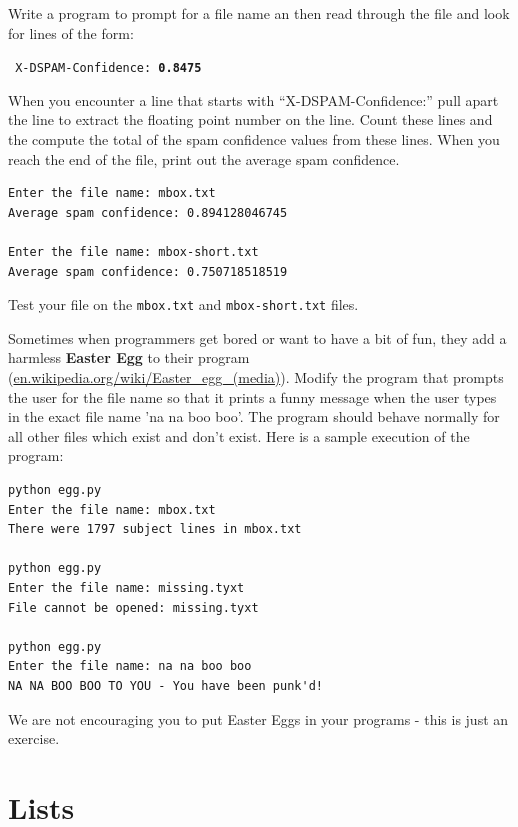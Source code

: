 \documentclass[10pt]{book}
\begin{document}
\begin{ex}
Write a program 
to prompt for a file name an then read through the file 
and look for lines of the form:

{\tt
X-DSPAM-Confidence: {\bf 0.8475}
}

When you encounter a line that starts with 
``X-DSPAM-Confidence:'' pull apart the line to extract the
floating point number on the line.  Count these 
lines and the compute the total of the spam confidence 
values from these lines.
When you reach the end of the file, print out the average
spam confidence.

\beforeverb
\begin{verbatim}
Enter the file name: mbox.txt
Average spam confidence: 0.894128046745

Enter the file name: mbox-short.txt
Average spam confidence: 0.750718518519
\end{verbatim}
\afterverb
%
Test your file on the {\tt mbox.txt} and {\tt mbox-short.txt} files.
\end{ex}


\begin{ex}
Sometimes when programmers get bored or want to have a bit of fun,
they add a harmless {\bf Easter Egg} to their program 
(\url{en.wikipedia.org/wiki/Easter_egg_(media)}). Modify the program
that prompts the user for the file name so that it prints a funny
message when the user types in the exact file name 'na na boo boo'. 
The program should behave normally for all other files which exist
and don't exist.  Here is a sample execution of the program:

\beforeverb
\begin{verbatim}
python egg.py 
Enter the file name: mbox.txt
There were 1797 subject lines in mbox.txt

python egg.py 
Enter the file name: missing.tyxt
File cannot be opened: missing.tyxt

python egg.py 
Enter the file name: na na boo boo
NA NA BOO BOO TO YOU - You have been punk'd!
\end{verbatim}
\afterverb
%
We are not encouraging you to put Easter Eggs in your programs -
this is just an exercise.

\end{ex}

\chapter{Lists}

\end{document}
